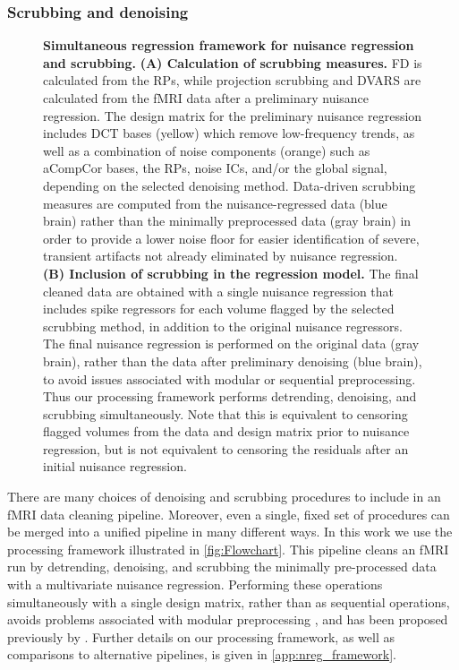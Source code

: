 \documentclass{article}
\begin{document}
\subsubsection{Scrubbing and denoising}\label{sec:cleaning_methods}

\begin{figure}
    \centering
    \caption{\small \textbf{Simultaneous regression framework for nuisance regression and scrubbing.} \textbf{(A) Calculation of scrubbing measures.} FD is calculated from the RPs, while projection scrubbing and DVARS are calculated from the fMRI data after a preliminary nuisance regression. The design matrix for the preliminary nuisance regression includes DCT bases (yellow) which remove low-frequency trends, as well as a combination of noise components (orange) such as aCompCor bases, the RPs, noise ICs, and/or the global signal, depending on the selected denoising method. Data-driven scrubbing measures are computed from the nuisance-regressed data (blue brain) rather than the minimally preprocessed data (gray brain) in order to provide a lower noise floor for easier identification of severe, transient artifacts not already eliminated by nuisance regression. \textbf{(B) Inclusion of scrubbing in the regression model.}  The final cleaned data are obtained with a single nuisance regression that includes spike regressors for each volume flagged by the selected scrubbing method, in addition to the original nuisance regressors. The final nuisance regression is performed on the original data (gray brain), rather than the data after preliminary denoising (blue brain), to avoid issues associated with modular or sequential preprocessing. Thus our processing framework performs detrending, denoising, and scrubbing simultaneously. Note that this is equivalent to censoring flagged volumes from the data and design matrix prior to nuisance regression, but is not equivalent to censoring the residuals after an initial nuisance regression.}
    \label{fig:Flowchart}
\end{figure}

There are many choices of denoising and scrubbing procedures to include in an fMRI data cleaning pipeline. Moreover, even a single, fixed set of procedures can be merged into a unified pipeline in many different ways. In this work we use the processing framework illustrated in \autoref{fig:Flowchart}. This pipeline cleans an fMRI run by detrending, denoising, and scrubbing the minimally pre-processed data with a multivariate nuisance regression. Performing these operations simultaneously with a single design matrix, rather than as sequential operations, avoids problems associated with modular preprocessing \citep{lindquistModularPreprocessingPipelines2019}, and has been proposed previously by \cite{jo2013effective}. Further details on our processing framework, as well as comparisons to alternative pipelines, is given in \autoref{app:nreg_framework}. %
\end{document}
